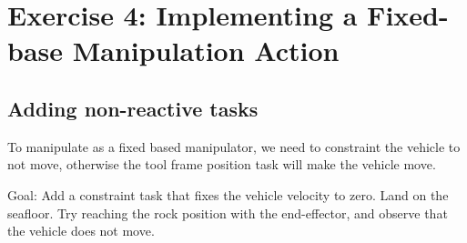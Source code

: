 	\section{Exercise 4: Implementing a Fixed-base Manipulation Action}
	\subsection{Adding non-reactive tasks}
	\question
	To manipulate as a fixed based manipulator, we need to constraint the vehicle to
	not move, otherwise the tool frame position task will make the vehicle move.

	Goal: Add a constraint task that fixes the vehicle velocity to zero. Land on the
	seafloor. Try reaching the rock position with the end-effector, and observe that
	the vehicle does not move.

